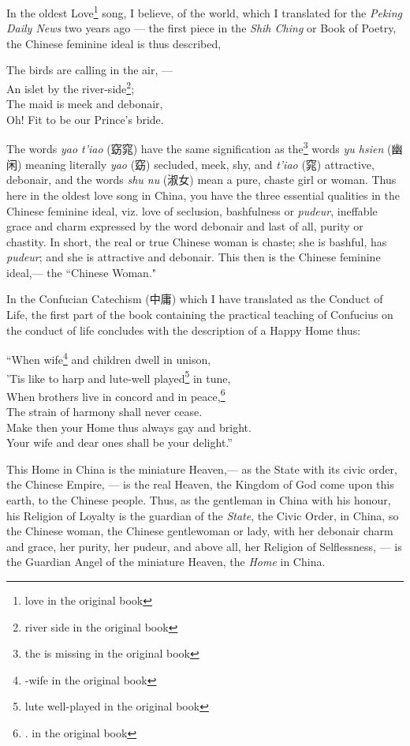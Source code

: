 In the oldest Love\footnote{love in the original book} song, I believe, of the world, which I translated for the \emph{Peking Daily News} two years ago --- the first piece in the \emph{Shih Ching} or Book of Poetry, the Chinese feminine ideal is thus described,
\begin{center}
   The birds are calling in the air, ---\\
   An islet by the river-side\footnote{river side in the original book};\\
   The maid is meek and debonair,\\
   Oh! Fit to be our Prince's bride.\\
\end{center}

The words \emph{yao t'iao} (窈窕) have the same signification as the\footnote{the is missing in the original book} words \emph{yu hsien} (幽闲) meaning literally \emph{yao} (窈) secluded, meek, shy, and \emph{t'iao} (窕) attractive, debonair, and the words \emph{shu nu} (淑女) mean a pure, chaste girl or woman.
Thus here in the oldest love song in China, you have the three essential qualities in the Chinese feminine ideal, viz. love of seclusion, bashfulness or \emph{pudeur}, ineffable grace and charm expressed by the word debonair and last of all, purity or chastity.
In short, the real or true Chinese woman is chaste; she is bashful, has \emph{pudeur}; and she is attractive and debonair.
This then is the Chinese feminine ideal,--- the ``Chinese Woman."

In the Confucian Catechism (中庸) which I have translated as the Conduct of Life, the first part of the book containing the practical teaching of Confucius on the conduct of life concludes with the description of a Happy Home thus:
\begin{center}
    ``When wife\footnote{-wife in the original book} and children dwell in unison,\\
    'Tis like to harp and lute-well played\footnote{lute well-played in the original book} in tune,\\
    When brothers live in concord and in peace,\footnote{. in the original book}\\
   The strain of harmony shall never cease.\\
   Make then your Home thus always gay and bright.\\
   Your wife and dear ones shall be your delight.''\\
\end{center}

This Home in China is the miniature Heaven,--- as the State with its civic order, the Chinese Empire, --- is the real Heaven, the Kingdom of God come upon this earth, to the Chinese people.
Thus, as the gentleman in China with his honour, his Religion of Loyalty is the guardian of the \emph{State}, the Civic Order, in China, so the Chinese woman, the Chinese gentlewoman or lady, with her debonair charm and grace, her purity, her pudeur, and above all, her Religion of Selflessness, --- is the Guardian Angel of the miniature Heaven, the \emph{Home} in China.         

